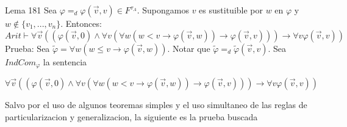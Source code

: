 Lema 181 Sea \(\varphi =_{d}\varphi (\vec{v},v)\in F^{\tau _{A}}\). Supongamos \(v\) es sustituible por \(w\) en \(\varphi \) y \(w\notin \{v_{1},...,v_{n}\}.\) Entonces:
\(\displaystyle Arit\vdash \forall \vec{v}((\varphi (\vec{v},0)\wedge \forall v(\forall w(w< v\rightarrow \varphi (\vec{v},w))\rightarrow \varphi (\vec{v} ,v)))\rightarrow \forall v\varphi (\vec{v},v)) \)
Prueba: Sea \(\tilde{\varphi}=\forall w(w\leq v\rightarrow \varphi (\vec{v},w))\). Notar que \(\tilde{\varphi}=_{d}\tilde{\varphi}(\vec{v},v)\). Sea \( IndCom_{\varphi }\) la sentencia

\(\displaystyle \forall \vec{v}((\varphi (\vec{v},0)\wedge \forall v(\forall w(w< v\rightarrow \varphi (\vec{v},w))\rightarrow \varphi (\vec{v} ,v)))\rightarrow \forall v\varphi (\vec{v},v)) \)

Salvo por el uso de algunos teoremas simples y el uso simultaneo de las reglas de particularizacion y generalizacion, la siguiente es la prueba buscada

